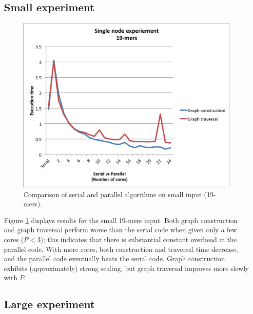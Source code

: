 \documentclass{article}
\begin{document}
\subsection{Small experiment}

\begin{figure}
  \includegraphics[width=\textwidth]{plots/Result_single_small.png}
  \caption{Comparison of serial and parallel algorithms on small input (19-mers).}
  \label{fig:small}
\end{figure}

Figure \ref{fig:small} displays results for the small 19-mers input.  Both graph construction and graph traversal perform worse than the serial code when given only a few cores ($P<3$); this indicates that there is substantial constant overhead in the parallel code.  With more cores, both construction and traversal time decrease, and the parallel code eventually beats the serial code.  Graph construction exhibits (approximately) strong scaling, but graph traversal improves more slowly with $P$.

\subsection{Large experiment}
\end{document}
